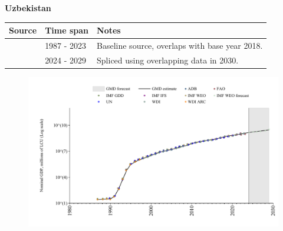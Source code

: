 \documentclass[12pt,a4paper,landscape]{article}
\begin{document}
\begin{adjustbox}{max totalsize={\paperwidth}{\paperheight},center}
\begin{minipage}[t][\textheight][t]{\textwidth}
\vspace*{0.5cm}
{}
\begin{center}
{\Large\bfseries Uzbekistan}
\end{center}
\vspace{0.5cm}
\begin{table}[H]
\centering
\small
\begin{tabular}{|l|l|l|}
\hline
\textbf{Source} & \textbf{Time span} & \textbf{Notes} \\
\hline
\rowcolor{white}\cite{WDI}& 1987 - 2023 &Baseline source, overlaps with base year 2018.\\
\rowcolor{lightgray}\cite{IMF_WEO_forecast}& 2024 - 2029 &Spliced using overlapping data in 2030.\\
\hline
\end{tabular}
\end{table}
\begin{figure}[H]
\centering
\includegraphics[width=\textwidth,height=0.6\textheight,keepaspectratio]{graphs/UZB_nGDP.pdf}
\end{figure}
\end{minipage}
\end{adjustbox}
\end{document}

